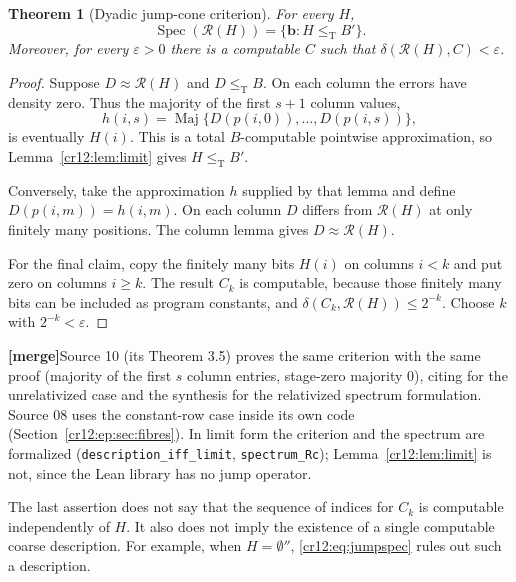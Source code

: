 \documentclass[11pt,letterpaper]{article}
\theoremstyle{plain}
\newtheorem{theorem}{Theorem}[section]
\theoremstyle{definition}
\theoremstyle{remark}
\numberwithin{equation}{section}
\newcommand{\leT}{\leq_{\mathrm T}}
\newcommand{\Spec}{\operatorname{Spec}}
\newcommand{\Rcode}{\mathcal R}
\newcommand{\mergenote}[1]{\par\smallskip\noindent
 {\small\textsf{\textbf{[merge]}}\enspace #1}\par\smallskip}
\begin{document}
\begin{theorem}[Dyadic jump-cone criterion]\label{cr12:thm:jump-spectrum}
For every $H$,
\begin{equation}\label{cr12:eq:jumpspec}
 \Spec(\Rcode(H))=\{\mathbf b:H\leT B'\}.
\end{equation}
Moreover, for every $\varepsilon>0$ there is a computable $C$ such that
$\delta(\Rcode(H),C)<\varepsilon$.
\end{theorem}
\begin{proof}
Suppose $D\approx\Rcode(H)$ and $D\leT B$. On each column the errors have
density zero. Thus the majority of the first $s+1$ column values,
\[
 h(i,s)=\operatorname{Maj}\{D(p(i,0)),\ldots,D(p(i,s))\},
\]
is eventually $H(i)$. This is a total $B$-computable pointwise approximation,
so Lemma~\ref{cr12:lem:limit} gives $H\leT B'$.

Conversely, take the approximation $h$ supplied by that lemma and define
$D(p(i,m))=h(i,m)$. On each column $D$ differs from $\Rcode(H)$ at only
finitely many positions. The column lemma gives $D\approx\Rcode(H)$.

For the final claim, copy the finitely many bits $H(i)$ on columns $i<k$ and
put zero on columns $i\ge k$. The result $C_k$ is computable, because those
finitely many bits can be included as program constants, and
$\delta(C_k,\Rcode(H))\le2^{-k}$. Choose $k$ with $2^{-k}<\varepsilon$.
\end{proof}
\mergenote{Source 10 (its Theorem 3.5) proves the same criterion with the same proof
(majority of the first $s$ column entries, stage-zero majority $0$), citing
\cite[Theorem~2.19]{JS} for the unrelativized case and the synthesis for the
relativized spectrum formulation. Source 08 uses the constant-row case inside its
own code (Section~\ref{cr12:ep:sec:fibres}). In limit form the criterion and the
spectrum are formalized (\texttt{description\_iff\_limit}, \texttt{spectrum\_Rc});
Lemma~\ref{cr12:lem:limit} is not, since the Lean library has no jump operator.}

The last assertion does not say that the sequence of indices for $C_k$ is
computable independently of $H$. It also does not imply the existence of a
single computable coarse description. For example, when $H=\emptyset''$,
\eqref{cr12:eq:jumpspec} rules out such a description.
\end{document}

